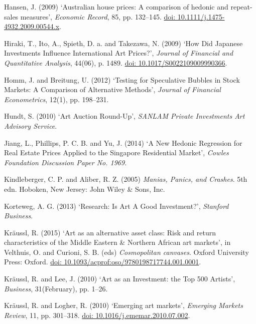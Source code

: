 \documentclass[12pt,]{article}
\begin{document}
Hansen, J. (2009) `Australian house prices: A comparison of hedonic and
repeat-sales measures', \emph{Economic Record}, 85, pp. 132--145.
\href{http://doi.org/10.1111/j.1475-4932.2009.00544.x}{doi: 10.1111/j.1475-4932.2009.00544.x}.

Hiraki, T., Ito, A., Spieth, D. a. and Takezawa, N. (2009) `How Did
Japanese Investments Influence International Art Prices?', \emph{Journal
of Financial and Quantitative Analysis}, 44(06), p. 1489.
\href{http://doi.org/10.1017/S0022109009990366}{doi: 10.1017/S0022109009990366}.

Homm, J. and Breitung, U. (2012) `Testing for Speculative Bubbles in
Stock Markets: A Comparison of Alternative Methods', \emph{Journal of
Financial Econometrics}, 12(1), pp. 198--231.

Hundt, S. (2010) `Art Auction Round-Up', \emph{SANLAM Private
Investments Art Advisory Service}.

Jiang, L., Phillips, P. C. B. and Yu, J. (2014) `A New Hedonic
Regression for Real Estate Prices Applied to the Singapore Residential
Market', \emph{Cowles Foundation Discussion Paper No. 1969}.

Kindleberger, C. P. and Aliber, R. Z. (2005) \emph{Manias, Panics, and
Crashes}. 5th edn. Hoboken, New Jersey: John Wiley \& Sons, Inc.

Korteweg, A. G. (2013) `Research: Is Art A Good Investment?',
\emph{Stanford Business}.

Kräussl, R. (2015) `Art as an alternative asset class: Risk and return
characteristics of the Middle Eastern \& Northern African art markets',
in Velthuis, O. and Curioni, S. B. (eds) \emph{Cosmopolitan canvases}.
Oxford University Press: Oxford.
\href{http://doi.org/10.1093/acprof:oso/9780198717744.001.0001}{doi: 10.1093/acprof:oso/9780198717744.001.0001}.

Kräussl, R. and Lee, J. (2010) `Art as an Investment: the Top 500
Artists', \emph{Business}, 31(February), pp. 1--26.

Kräussl, R. and Logher, R. (2010) `Emerging art markets', \emph{Emerging
Markets Review}, 11, pp. 301--318.
\href{http://doi.org/10.1016/j.ememar.2010.07.002}{doi: 10.1016/j.ememar.2010.07.002}.
\end{document}
